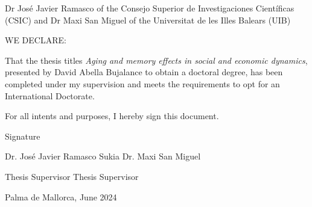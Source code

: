 \thispagestyle{empty}

Dr Jos\'e Javier Ramasco of the Consejo Superior de Investigaciones Cient\'ificas (CSIC) and Dr Maxi San Miguel of the Universitat de les Illes Balears (UIB)

\vspace*{2 cm}

WE DECLARE:

\vspace*{1 cm}

That the thesis titles \textit{Aging and memory effects in social and economic dynamics}, presented by David Abella Bujalance to obtain a doctoral degree, has been completed under my supervision and meets the requirements to opt for an International Doctorate.

\vspace*{2 cm}

For all intents and purposes, I hereby sign this document.

\vspace*{2 cm}

Signature

\vspace*{3 cm}

      Dr. Jos\'e Javier Ramasco Sukia              \hfill Dr. Maxi San Miguel


\vspace*{0.1 cm}

        Thesis Supervisor              \hfill Thesis Supervisor

\vspace*{1 cm}

        Palma de Mallorca, June 2024

\vfill